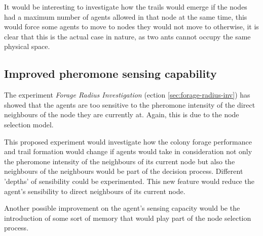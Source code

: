 It would be interesting to investigate how the trails would emerge if the nodes had a maximum number of agents allowed in that node at the same time, this would force some agents to move to nodes they would not move to otherwise, it is clear that this is the actual case in nature, as two ants cannot occupy the same physical space. 

\subsection{Improved pheromone sensing capability}

The experiment \emph{Forage Radius Investigation} (ection \ref{sec:forage-radius-inv}) has showed that the agents are too sensitive to the pheromone intensity of the direct neighbours of the node they are currently at. Again, this is due to the node selection model.

This proposed experiment would investigate how the colony forage performance and trail formation would change if agents would take in consideration not only the pheromone intensity of the neighbours of its current node but also the neighbours of the neighbours would be part of the decision process. Different 'depths' of sensibility could be experimented. This new feature would reduce the agent's sensibility to direct neighbours of its current node. 

Another possible improvement on the agent's sensing capacity would be the introduction of some sort of memory that would play part of the node selection process.